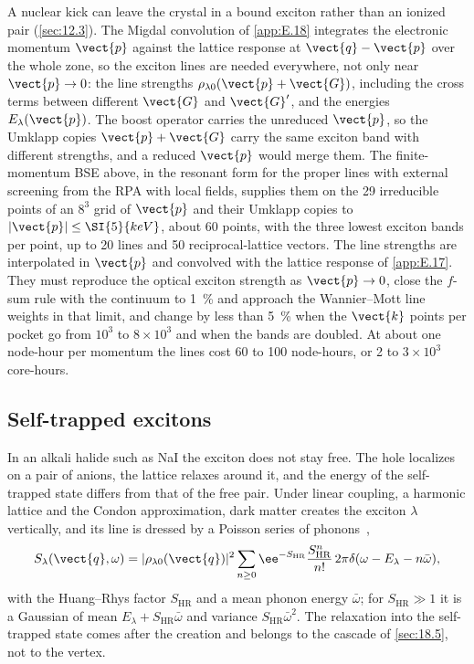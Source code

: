 A nuclear kick can leave the crystal in a bound exciton rather than an ionized pair (\cref{sec:12.3}). The Migdal convolution of \cref{app:E.18} integrates the electronic momentum $\vect{p}$ against the lattice response at $\vect{q} - \vect{p}$ over the whole zone, so the exciton lines are needed everywhere, not only near $\vect{p}\to0$: the line strengths $\rho_{\lambda0}(\vect{p}+\vect{G})$, including the cross terms between different $\vect{G}$ and $\vect{G}'$, and the energies $E_\lambda(\vect{p})$. The boost operator carries the unreduced $\vect{p}$, so the Umklapp copies $\vect{p}+\vect{G}$ carry the same exciton band with different strengths, and a reduced $\vect{p}$ would merge them. The finite-momentum BSE above, in the resonant form for the proper lines with external screening from the RPA with local fields, supplies them on the 29 irreducible points of an $8^3$ grid of $\vect{p}$ and their Umklapp copies to $|\vect{p}| \le \SI{5}{keV}$, about 60 points, with the three lowest exciton bands per point, up to 20 lines and 50 reciprocal-lattice vectors. The line strengths are interpolated in $\vect{p}$ and convolved with the lattice response of \cref{app:E.17}. They must reproduce the optical exciton strength as $\vect{p}\to0$, close the $f$-sum rule with the continuum to \SI{1}{\percent} and approach the Wannier--Mott line weights in that limit, and change by less than \SI{5}{\percent} when the $\vect{k}$ points per pocket go from $10^3$ to $8\times10^3$ and when the bands are doubled. At about one node-hour per momentum the lines cost 60 to 100 node-hours, or 2 to $3\times10^3$ core-hours.

\subsection{Self-trapped excitons}

In an alkali halide such as NaI the exciton does not stay free. The hole localizes on a pair of anions, the lattice relaxes around it, and the energy of the self-trapped state differs from that of the free pair. Under linear coupling, a harmonic lattice and the Condon approximation, dark matter creates the exciton $\lambda$ vertically, and its line is dressed by a Poisson series of phonons~\cite{huang1950theory},
\begin{equation}
  S_\lambda(\vect{q},\omega) = |\rho_{\lambda0}(\vect{q})|^2\sum_{n\ge0}\ee^{-S_{\mathrm{HR}}}\frac{S_{\mathrm{HR}}^n}{n!}\,2\pi\delta(\omega - E_\lambda - n\bar\omega) ,
  \label{eq:E.15-ste}
\end{equation}
with the Huang--Rhys factor $S_{\mathrm{HR}}$ and a mean phonon energy $\bar\omega$; for $S_{\mathrm{HR}} \gg 1$ it is a Gaussian of mean $E_\lambda + S_{\mathrm{HR}}\bar\omega$ and variance $S_{\mathrm{HR}}\bar\omega^2$. The relaxation into the self-trapped state comes after the creation and belongs to the cascade of \cref{sec:18.5}, not to the vertex.


